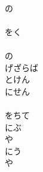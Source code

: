 \documentclass[10pt,b5j]{tarticle} %
\begin{document}
\begin{enumerate}
\begin{minipage}[c]{\blocksize}
    \end{minipage}
    \begin{minipage}[c]{\blocksize}
        
        \vspace{\linespace}
        \item~\\
        の\\
        \\
        をく\\
        \\
        の\\
        げざらば\\
        とけん\\
        にせん\\
        \\
        をちて\\
        にぶ\\
        や\\
        にう\\
        や
    
    \end{minipage}
\end{enumerate} %
\end{document}
